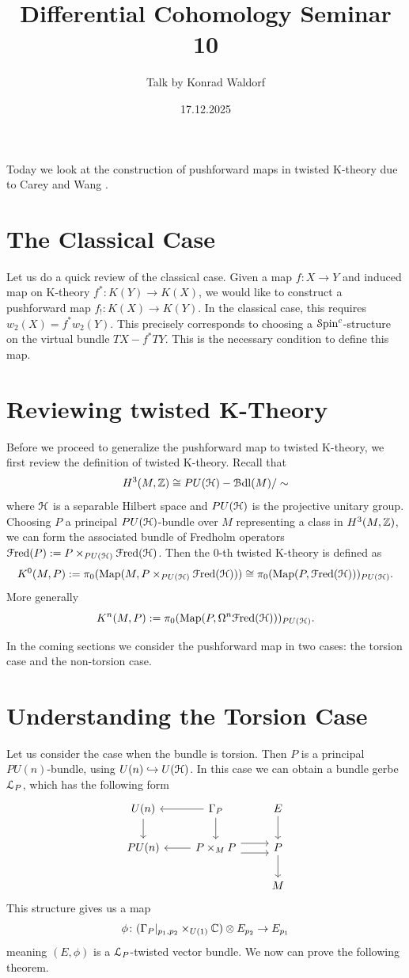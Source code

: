 \documentclass[10pt]{amsart}
\title{Differential Cohomology Seminar 10}
\date{17.12.2025}
\author{Talk by Konrad Waldorf}
\begin{document}
\maketitle

Today we look at the construction of pushforward maps in twisted K-theory due to Carey and Wang \cite{careywang2008thomisomorphism}.

\section{The Classical Case}
Let us do a quick review of the classical case. Given a map $f\colon X \to Y$ and induced map on K-theory $f^*\colon K(Y) \to K(X)$, we would like to construct a pushforward map $f_!\colon K(X) \to K(Y)$. In the classical case, this requires $w_2(X)	= f^* w_2(Y)$. This precisely corresponds to choosing a $\mathcal{S}\mathrm{pin}^c$-structure on the virtual bundle $TX - f^* TY$. This is the necessary condition to define this map.

\section{Reviewing twisted K-Theory}
Before we proceed to generalize the pushforward map to twisted K-theory, we first review the definition of twisted K-theory. Recall that 
\[ H^3(M,\mathbb{Z}) \cong PU(\mathcal{H}) - \mathcal{B}\mathrm{dl}(M)/ \sim \] 
where $\mathcal{H}$ is a separable Hilbert space and $PU(\mathcal{H})$ is the projective unitary group. Choosing $P$ a principal $PU(\mathcal{H})$-bundle over $M$ representing a class in $H^3(M,\mathbb{Z})$, we can form the associated bundle of Fredholm operators $\mathcal{F}\mathrm{red}(P) := P \times_{PU(\mathcal{H})} \mathcal{F}\mathrm{red}(\mathcal{H})$. Then the $0$-th twisted K-theory is defined as
\[K^0(M,P) := \pi_0(\mathrm{Map}(M, P\times_{PU(\mathcal{H})} \mathcal{F}\mathrm{red}(\mathcal{H}))) \cong \pi_0(\mathrm{Map}(P, \mathcal{F}\mathrm{red}(\mathcal{H})))_{PU(\mathcal{H})}. \]
More generally 
\[ K^n(M,P) := \pi_0(\mathrm{Map}(P, \Omega^n \mathcal{F}\mathrm{red}(\mathcal{H})))_{PU(\mathcal{H})}. \]

In the coming sections we consider the pushforward map in two cases: the torsion case and the non-torsion case.

\section{Understanding the Torsion Case}
Let us consider the case when the bundle is torsion. Then $P$ is a principal $PU(n)$-bundle, using $U(n) \hookrightarrow	U(\mathcal{H})$. In this case we can obtain a bundle gerbe $\mathcal{L}_P$, which has the following form 
 \[ 
	\begin{tikzcd}
	U(n) \arrow[d] & \Gamma_P \arrow[d] \arrow[l] & E \arrow[d] \\ 
	PU(n) & P \times_M P \arrow[l] \arrow[r, shift left = 1.8] \arrow[r, shift right = 1.8] & P \arrow[d] \\ 
	 & & M  
	\end{tikzcd}
	\]  
	This structure gives us a map 
	\[ 
	\phi\colon (\Gamma_P|_{p_1,p_2} \times_{U(1)} \mathbb{C}) \otimes E_{p_2} \to E_{p_1}
	\]
	meaning $(E,\phi)$	is a $\mathcal{L}_P$-twisted vector bundle.	We now can prove	the following theorem.
\end{document}
